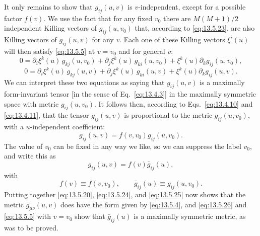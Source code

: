 It only remains to show that \(g_{ij}(u,v)\) is \(v\)-independent, except
for a possible factor \(f(v)\). We use the fact that for any fixed \(v_0\)
there are \(M(M+1)/2\) independent Killing vectors of \(g_{ij}(u,v_0)\)
that, according to \eqref{eq:13.5.23}, are also Killing vectors of
\(g_{ij}(u,v)\) for any \(v\). Each one of these Killing vectors
\(\xi^i(u)\) will then satisfy \eqref{eq:13.5.5} at \(v=v_0\) and for
general \(v\):
\[
  0
  =
  \partial_i\xi^k(u)\,g_{kj}(u,v_0)
  +\partial_j\xi^k(u)\,g_{ki}(u,v_0)
  +\xi^k(u)\partial_k g_{ij}(u,v_0),
\]
\[
  0
  =
  \partial_i\xi^k(u)\,g_{kj}(u,v)
  +\partial_j\xi^k(u)\,g_{ki}(u,v)
  +\xi^k(u)\partial_k g_{ij}(u,v).
\]
We can interpret these two equations as saying that \(g_{ij}(u,v)\) is a
maximally form-invariant tensor [in the sense of Eq.~\eqref{eq:13.4.3}] in
the maximally symmetric space with metric \(g_{ij}(u,v_0)\). It follows
then, according to Eqs.~\eqref{eq:13.4.10} and \eqref{eq:13.4.11}, that
the tensor \(g_{ij}(u,v)\) is proportional to the metric \(g_{ij}(u,v_0)\),
with a \(u\)-independent coefficient:
\[
  g_{ij}(u,v)=f(v,v_0)g_{ij}(u,v_0).
\]
The value of \(v_0\) can be fixed in any way we like, so we can suppress the
label \(v_0\), and write this as
\begin{equation}
  g_{ij}(u,v)=f(v)\bar g_{ij}(u),
  \tag{13.5.25}\label{eq:13.5.25}
\end{equation}
with
\begin{equation}
  f(v)\equiv f(v,v_0),
  \qquad
  \bar g_{ij}(u)\equiv g_{ij}(u,v_0).
  \tag{13.5.26}\label{eq:13.5.26}
\end{equation}
Putting together \eqref{eq:13.5.20}, \eqref{eq:13.5.24}, and
\eqref{eq:13.5.25} now shows that the metric \(g_{\mu\nu}(u,v)\) does have
the form given by \eqref{eq:13.5.4}, and \eqref{eq:13.5.26} and
\eqref{eq:13.5.5} with \(v=v_0\) show that \(\bar g_{ij}(u)\) is a
maximally symmetric metric, as was to be proved.

